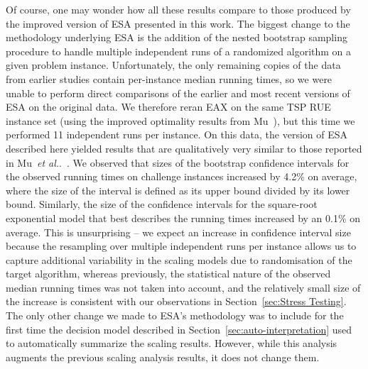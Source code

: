 \documentclass[aic]{iosart2x}
\newcommand{\etal}{\emph{et al.}}
\begin{document}
Of course, one may wonder how all these results compare to those produced by the improved version of ESA presented in this work.
The biggest change to the methodology underlying ESA is the addition of the nested bootstrap sampling procedure to handle multiple independent runs of a randomized algorithm on a given problem instance. 
Unfortunately, the only remaining copies of the data from earlier studies contain per-instance median running times, so we were unable to perform direct comparisons of the earlier and most recent versions of ESA on the original data. We therefore reran EAX on the same TSP RUE instance set (using the improved optimality results from Mu~\cite{Mu15}), but this time we performed 11 independent runs per instance.
On this data, the version of ESA described here yielded results that are qualitatively very similar to those reported in Mu~\etal{}.~\cite{MuEtAl16}. We observed that sizes of the bootstrap confidence intervals for the observed running times on challenge instances increased by 4.2\% on average, where the size of the interval is defined as its upper bound divided by its lower bound. Similarly, the size of the confidence intervals for the square-root exponential model that best describes the running times increased by an 0.1\% on average. 
This is unsurprising -- we expect an increase in confidence interval size because the resampling over multiple independent runs per instance allows us to capture additional variability in the scaling models due to randomisation of the target algorithm, whereas previously, the statistical nature of the observed median running times was not taken into account, and the relatively small size of the increase is consistent with our observations in Section~\ref{sec:Stress Testing}.
The only other change we made to ESA's methodology was to include for the first time the decision model described in Section~\ref{sec:auto-interpretation} used to automatically summarize the scaling results. However, while this analysis augments the previous scaling analysis results, it does not change them.
\end{document}
